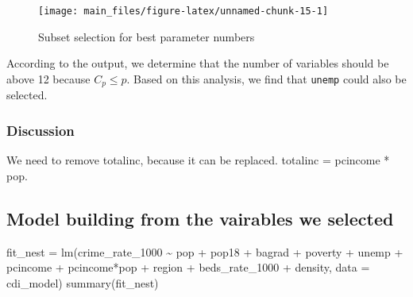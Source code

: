 \documentclass[
  11pt,
]{article}
\newenvironment{Shaded}{\begin{snugshade}}{\end{snugshade}}
\newcommand{\AttributeTok}[1]{\textcolor[rgb]{0.77,0.63,0.00}{#1}}
\newcommand{\FunctionTok}[1]{\textcolor[rgb]{0.00,0.00,0.00}{#1}}
\newcommand{\NormalTok}[1]{#1}
\newcommand{\OtherTok}[1]{\textcolor[rgb]{0.56,0.35,0.01}{#1}}
\newcommand{\SpecialCharTok}[1]{\textcolor[rgb]{0.00,0.00,0.00}{#1}}
\begin{document}
\begin{figure}
\texttt{[image: main\_files/figure-latex/unnamed-chunk-15-1]} \caption{\label{fig:figs}Subset selection for best parameter numbers}\label{fig:unnamed-chunk-15}
\end{figure}

According to the output, we determine that the number of variables
should be above 12 because \(C_p \leq p\). Based on this analysis, we
find that \texttt{unemp} could also be selected.

\hypertarget{discussion}{%
\subsubsection{Discussion}\label{discussion}}

We need to remove totalinc, because it can be replaced. totalinc =
pcincome * pop.

\hypertarget{model-building-from-the-vairables-we-selected}{%
\subsection{Model building from the vairables we
selected}\label{model-building-from-the-vairables-we-selected}}

\begin{Shaded}
\begin{Highlighting}[]
\NormalTok{fit\_nest }\OtherTok{=} \FunctionTok{lm}\NormalTok{(crime\_rate\_1000 }\SpecialCharTok{\textasciitilde{}}  
\NormalTok{                  pop }\SpecialCharTok{+}\NormalTok{ pop18 }\SpecialCharTok{+}\NormalTok{ bagrad }\SpecialCharTok{+}
\NormalTok{                  poverty }\SpecialCharTok{+}\NormalTok{ unemp }\SpecialCharTok{+}\NormalTok{ pcincome }\SpecialCharTok{+}\NormalTok{ pcincome}\SpecialCharTok{*}\NormalTok{pop }\SpecialCharTok{+}\NormalTok{ region }\SpecialCharTok{+}
\NormalTok{                  beds\_rate\_1000 }\SpecialCharTok{+}\NormalTok{ density, }\AttributeTok{data =}\NormalTok{ cdi\_model)}
\FunctionTok{summary}\NormalTok{(fit\_nest)}
\end{Highlighting}
\end{Shaded}
\end{document}
